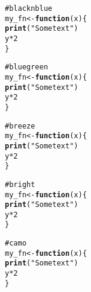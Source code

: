 \documentclass[12pt]{article}\usepackage{graphicx, color}
\makeatletter
\newcommand{\hlfunctioncall}[1]{\textcolor[rgb]{0.188235294117647,0.650980392156863,0.188235294117647}{\textbf{#1}}}%
\newcommand{\hlstring}[1]{\textcolor[rgb]{0.850980392156863,1,0.466666666666667}{#1}}%
\newcommand{\hlcomment}[1]{\textcolor[rgb]{0.533333333333333,0.533333333333333,0.533333333333333}{#1}}%
\newenvironment{kframe}{%
 \def\at@end@of@kframe{}%
 \ifinner\ifhmode%
  \def\at@end@of@kframe{\end{minipage}}%
  \begin{minipage}{\columnwidth}%
 \fi\fi%
 \def\FrameCommand##1{\hskip\@totalleftmargin \hskip-\fboxsep
 \colorbox{shadecolor}{##1}\hskip-\fboxsep
     \hskip-\linewidth \hskip-\@totalleftmargin \hskip\columnwidth}%
 \MakeFramed {\advance\hsize-\width
   \@totalleftmargin\z@ \linewidth\hsize
   \@setminipage}}%
 {\par\unskip\endMakeFramed%
 \at@end@of@kframe}
\newenvironment{knitrout}{}{} %
\makeatother
\begin{document}
\begin{knitrout}
\color{fgcolor}\begin{kframe}
\begin{alltt}
\hlcomment{# blacknblue}
my_fn <- \hlfunctioncall{function}(x) \{
    \hlfunctioncall{print}(\hlstring{"Some text"})
    y * 2
\}
\end{alltt}
\end{kframe}
\end{knitrout}





\begin{knitrout}
\color{fgcolor}\begin{kframe}
\begin{alltt}
\hlcomment{# bluegreen}
my_fn <- \hlfunctioncall{function}(x) \{
    \hlfunctioncall{print}(\hlstring{"Some text"})
    y * 2
\}
\end{alltt}
\end{kframe}
\end{knitrout}





\begin{knitrout}
\color{fgcolor}\begin{kframe}
\begin{alltt}
\hlcomment{# breeze}
my_fn <- \hlfunctioncall{function}(x) \{
    \hlfunctioncall{print}(\hlstring{"Some text"})
    y * 2
\}
\end{alltt}
\end{kframe}
\end{knitrout}





\begin{knitrout}
\color{fgcolor}\begin{kframe}
\begin{alltt}
\hlcomment{# bright}
my_fn <- \hlfunctioncall{function}(x) \{
    \hlfunctioncall{print}(\hlstring{"Some text"})
    y * 2
\}
\end{alltt}
\end{kframe}
\end{knitrout}





\begin{knitrout}
\color{fgcolor}\begin{kframe}
\begin{alltt}
\hlcomment{# camo}
my_fn <- \hlfunctioncall{function}(x) \{
    \hlfunctioncall{print}(\hlstring{"Some text"})
    y * 2
\}
\end{alltt}
\end{kframe}
\end{knitrout}
\end{document}
